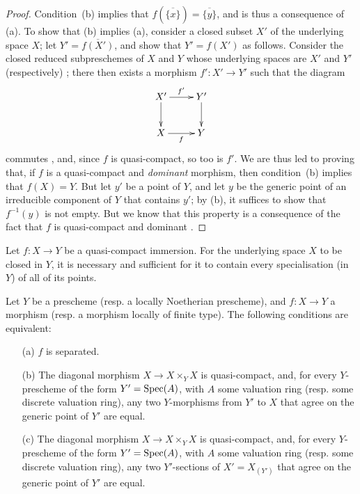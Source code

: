 \begin{proof}
Condition~(b) implies that $f(\overline{\{x\}})=\overline{\{y\}}$, and is thus a consequence of (a).
To show that (b) implies (a), consider a closed subset $X'$ of the underlying space $X$;
let $Y'=\overline{f(X')}$, and show that $Y'=f(X')$ as follows.
Consider the closed reduced subpreschemes of $X$ and $Y$ whose underlying spaces are $X'$ and $Y'$ (respectively) ;
there then exists a morphism $f':X'\to Y'$ such that the diagram
\[
    \xymatrix{
        X' \ar[r]^{f'} \ar[d]
        & Y' \ar[d]
    \\  X \ar[r]_{f}
        & Y
    }
\]
commutes , and, since $f$ is quasi-compact, so too is $f'$.
We are thus led to proving that, if $f$ is a quasi-compact and \emph{dominant} morphism, then
condition~(b) implies that $f(X)=Y$.
But let $y'$ be a point of $Y$, and let $y$ be the generic point of an irreducible component of $Y$ that contains $y'$;
by (b), it suffices to show that $f^{-1}(y)$ is not empty.
But we know that this property is a consequence of the fact that $f$ is quasi-compact and dominant .
\end{proof}

\begin{corollary}[7.2.2]
\label{II.7.2.2}
Let $f:X\to Y$ be a quasi-compact immersion.
For the underlying space $X$ to be closed in $Y$, it is necessary and sufficient for it to contain every specialisation (in $Y$) of all of its points.
\end{corollary}

\begin{proposition}[7.2.3]
\label{II.7.2.3}
Let $Y$ be a prescheme (resp. a locally Noetherian prescheme), and $f:X\to Y$ a morphism (resp. a morphism locally of finite type).
The following conditions are equivalent:
\begin{enumerate}
    \item[\rm{(a)}] $f$ is separated.
    \item[\rm{(b)}] The diagonal morphism $X\to X\times_Y X$ is quasi-compact, and, for every $Y$-prescheme of the form $Y'=\operatorname{Spec}(A)$, with $A$ some valuation ring (resp. some discrete valuation ring), any two $Y$-morphisms from $Y'$ to $X$ that agree on the generic point of $Y'$ are equal.
    \item[\rm{(c)}] The diagonal morphism $X\to X\times_Y X$ is quasi-compact, and, for every $Y$-prescheme of the form $Y'=\operatorname{Spec}(A)$, with $A$ some valuation ring (resp. some discrete valuation ring), any two $Y'$-sections of $X'=X_{(Y')}$ that agree on the generic point of $Y'$ are equal.
\end{enumerate}
\end{proposition}

